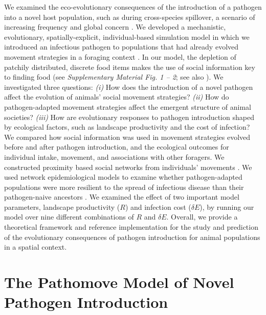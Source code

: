 We examined the eco-evolutionary consequences of the introduction of a pathogen into a novel host population, such as during cross-species spillover, a scenario of increasing frequency and global concern \citep{blehert2009,globconsorth5n82016,fereidouni2019,scheele2019,sanderson2020,carlson2022a,kuchipudi2022}.
We developed a mechanistic, evolutionary, spatially-explicit, individual-based simulation model in which we introduced an infectious pathogen to populations that had already evolved movement strategies in a foraging context \citep[see model code, analysis code, and reference data:][]{gupte2022,gupte2022a,gupte2022b}.
In our model, the depletion of patchily distributed, discrete food items makes the use of social information key to finding food (see \textit{Supplementary Material Fig. 1 -- 2}; see also \citealt{gupte2021a}).
We investigated three questions: \textit{(i)} How does the introduction of a novel pathogen affect the evolution of animals' social movement strategies?
\textit{(ii)} How do pathogen-adapted movement strategies affect the emergent structure of animal societies?
\textit{(iii)} How are evolutionary responses to pathogen introduction shaped by ecological factors, such as landscape productivity and the cost of infection?
We compared how social information was used in movement strategies evolved before and after pathogen introduction, and the ecological outcomes for individual intake, movement, and associations with other foragers.
We constructed proximity based social networks from individuals' movements \citep{whitehead2008,white2017,wilber2022}.
We used network epidemiological models to examine whether pathogen-adapted populations were more resilient to the spread of infectious disease than their pathogen-naive ancestors \citep[][]{white2017,stroeymeyt2018,wilber2022}.
We examined the effect of two important model parameters, landscape productivity ($R$) and infection cost ($\delta E$), by running our model over nine different combinations of $R$ and $\delta E$.
Overall, we provide a theoretical framework and reference implementation for the study and prediction of the evolutionary consequences of pathogen introduction for animal populations in a spatial context.

\section*{The Pathomove Model of Novel Pathogen Introduction}

